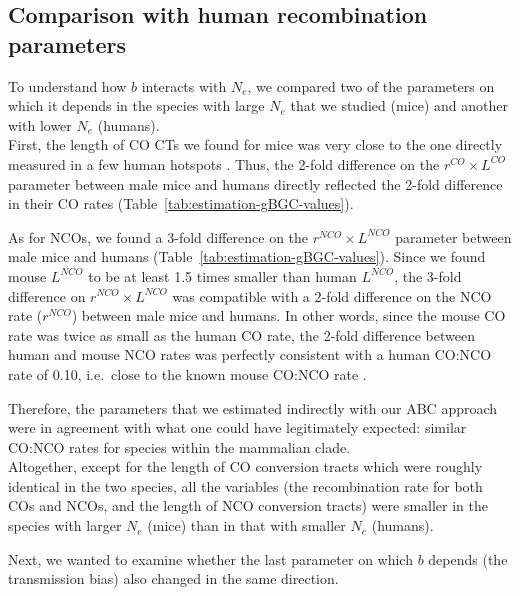 \subsection{Comparison with human recombination parameters}

To understand how $b$ interacts with $N_e$, we compared two of the parameters on which it depends in the species with large $N_e$ that we studied (mice) and another with lower $N_e$ (humans).\\

First, the length of CO CTs we found for mice was very close to the one directly measured in a few human hotspots \citep{jeffreys2004intense}.
Thus, the 2-fold difference on the $r^{CO} \times L^{CO}$ parameter between male mice and humans directly reflected the 2-fold difference in their CO rates (Table~\ref{tab:estimation-gBGC-values}).


As for NCOs, we found a 3-fold difference on the $r^{NCO} \times L^{NCO}$ parameter between male mice and humans (Table~\ref{tab:estimation-gBGC-values}).
Since we found mouse $L^{NCO}$ to be at least 1.5 times smaller than human $L^{NCO}$, the 3-fold difference on $r^{NCO} \times L^{NCO}$ was compatible with a 2-fold difference on the NCO rate ($r^{NCO}$) between male mice and humans. 
In other words, since the mouse CO rate was twice as small as the human CO rate, the 2-fold difference between human and mouse NCO rates was perfectly consistent with a human CO:NCO rate of 0.10, i.e.\ close to the known mouse CO:NCO rate \citep{cole2010comprehensive}.

Therefore, the parameters that we estimated indirectly with our ABC approach were in agreement with what one could have legitimately expected: similar CO:NCO rates for species within the mammalian clade.\\


Altogether, except for the length of CO conversion tracts which were roughly identical in the two species, all the variables (the recombination rate for both COs and NCOs, and the length of NCO conversion tracts) were smaller in the species with larger $N_e$ (mice) than in that with smaller $N_e$ (humans).

Next, we wanted to examine whether the last parameter on which $b$ depends (the transmission bias) also changed in the same direction.





